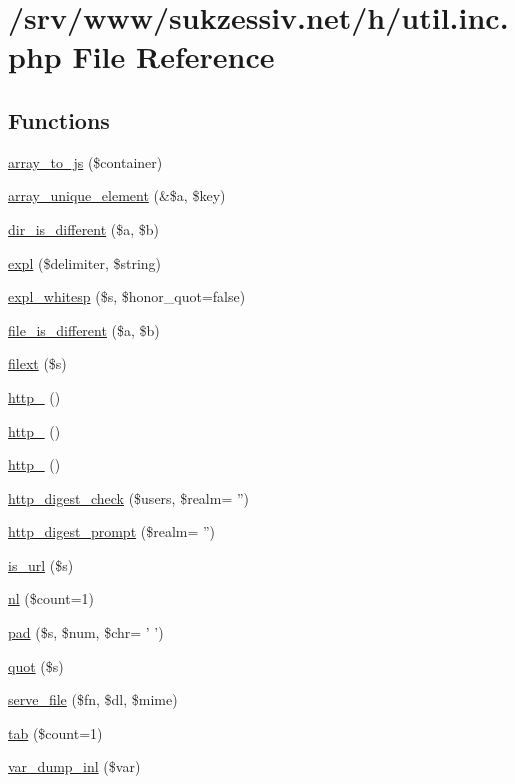 \hypertarget{util_8inc_8php}{
\section{/srv/www/sukzessiv.net/h/util.inc.php File Reference}
\label{util_8inc_8php}
}
\subsection*{Functions}
\begin{CompactItemize}
\item 
\hyperlink{util_8inc_8php_61d3b2881d9368741c71509017724bc8}{array\_\-to\_\-js} (\$container)
\item 
\hyperlink{util_8inc_8php_4647462c98447c6c2842f70d8c313f85}{array\_\-unique\_\-element} (\&\$a, \$key)
\item 
\hyperlink{util_8inc_8php_6309f576f2611237288d0dd3eed09db3}{dir\_\-is\_\-different} (\$a, \$b)
\item 
\hyperlink{util_8inc_8php_afce787d4b725ac62be6306ff3e352e7}{expl} (\$delimiter, \$string)
\item 
\hyperlink{util_8inc_8php_1d2500a5e237e59956b03cbea845c95a}{expl\_\-whitesp} (\$s, \$honor\_\-quot=false)
\item 
\hyperlink{util_8inc_8php_9c9a81ec9dba8b2870cbb365f8139866}{file\_\-is\_\-different} (\$a, \$b)
\item 
\hyperlink{util_8inc_8php_6d9392e51344c2e8720a0c1982ebea21}{filext} (\$s)
\item 
\hyperlink{util_8inc_8php_78288ca93c62ce2b5ef34f40352c7324}{http\_} ()
\item 
\hyperlink{util_8inc_8php_24f09c2c8205022b013bbee5293a38ae}{http\_} ()
\item 
\hyperlink{util_8inc_8php_575cc91d803ae46bbc5dfaecbeb3561d}{http\_} ()
\item 
\hyperlink{util_8inc_8php_ff065fbc9f3abbf9c5a0ebfba22acbf7}{http\_\-digest\_\-check} (\$users, \$realm= '')
\item 
\hyperlink{util_8inc_8php_95d221746e2d296434b0d63f78cedf57}{http\_\-digest\_\-prompt} (\$realm= '')
\item 
\hyperlink{util_8inc_8php_0da48011cb68c039aec396c23cb04295}{is\_\-url} (\$s)
\item 
\hyperlink{util_8inc_8php_9f9eeab2eb9a39518e80609fc7f83842}{nl} (\$count=1)
\item 
\hyperlink{util_8inc_8php_37ef346387afe0af2cf86a8bea887173}{pad} (\$s, \$num, \$chr= ' ')
\item 
\hyperlink{util_8inc_8php_3c7d87c658499c1559a6b98cac06f58d}{quot} (\$s)
\item 
\hyperlink{util_8inc_8php_9d3ab20fc8b79fb6ab860f93600c745e}{serve\_\-file} (\$fn, \$dl, \$mime)
\item 
\hyperlink{util_8inc_8php_74e38925e7162356a2ea14db32664c37}{tab} (\$count=1)
\item 
\hyperlink{util_8inc_8php_a5cc9d5f8a0b5bb76dfe3d15796e5940}{var\_\-dump\_\-inl} (\$var)
\end{CompactItemize}


